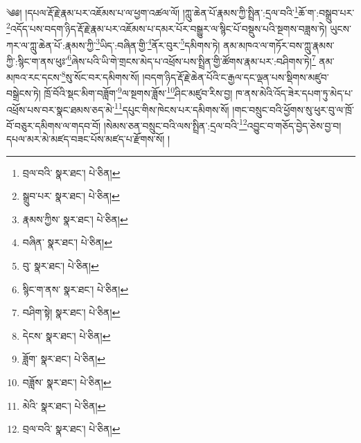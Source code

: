 \setcounter{footnote}{0} 
༄༅། །དཔལ་རྡོ་རྗེ་རྣམ་པར་འཇོམས་པ་ལ་ཕྱག་འཚལ་ལོ། །ཀླུ་ཆེན་པོ་རྣམས་ཀྱི་སྤྲིན་:དྲལ་བའི་\footnote{བྲལ་བའི་  སྣར་ཐང་།  པེ་ཅིན། }ཆོ་ག་:བསྒྲུབ་པར་\footnote{སྒྲུབ་པར་  སྣར་ཐང་།  པེ་ཅིན། }འདོད་པས་བདག་ཉིད་རྡོ་རྗེ་རྣམ་པར་འཇོམས་པ་དམར་པོར་བསྒྱུར་ལ་སྙིང་པོ་བསྡུས་པའི་སྔགས་བཟླས་ཏེ། ཡུངས་ཀར་ལ་ཀླུ་ཆེན་པོ་:རྣམས་ཀྱི་\footnote{རྣམས་ཀྱིས་  སྣར་ཐང་།  པེ་ཅིན། }ཡིད་:བཞིན་གྱི་\footnote{བཞིན་  སྣར་ཐང་།  པེ་ཅིན། }ནོར་བུར་\footnote{བུ་  སྣར་ཐང་།  པེ་ཅིན། }དམིགས་ཏེ། ནམ་མཁའ་ལ་གཏོར་བས་ཀླུ་རྣམས་ཀྱི་:སྙིང་ག་ནས་ཕུཿ་\footnote{སྙིང་ག་ནས་  སྣར་ཐང་།  པེ་ཅིན། }ཞེས་པའི་ཡི་གེ་གྲངས་མེད་པ་འཕྲོས་པས་སྤྲིན་གྱི་ཚོགས་རྣམ་པར་:བཤིགས་ཏེ།\footnote{བཤིག་སྟེ།  སྣར་ཐང་།  པེ་ཅིན། } ནམ་མཁའ་རང་དངས་\footnote{དེངས་  སྣར་ཐང་།  པེ་ཅིན། }སུ་སོང་བར་དམིགས་སོ། །བདག་ཉིད་རྡོ་རྗེ་ཆེན་པོའི་ང་རྒྱལ་དང་ལྡན་པས་སྡིགས་མཛུབ་བསྒྲེངས་ཏེ། ཁྲོ་བོའི་སྡང་མིག་བཟློག་\footnote{ཟློག་  སྣར་ཐང་།  པེ་ཅིན། }ལ་སྔགས་ཟློས་\footnote{བཟློས་  སྣར་ཐང་།  པེ་ཅིན། }ཤིང་མཛུབ་རིས་བྱ། ཁ་ནས་མེའི་འོད་ཟེར་དཔག་ཏུ་མེད་པ་འཕྲོས་པས་བར་སྣང་ཐམས་ཅད་མེ་\footnote{མེའི་  སྣར་ཐང་།  པེ་ཅིན། }དཔུང་གིས་ཁེངས་པར་དམིགས་སོ། །གང་བསྲུང་བའི་ཕྱོགས་སུ་ཕུར་བུ་ལ་ཁྲོ་བོ་བཅུར་དམིགས་ལ་གདབ་བོ། །སེམས་ཅན་བསྲུང་བའི་ལས་སྤྲིན་:དྲལ་བའི་\footnote{བྲལ་བའི་  སྣར་ཐང་།  པེ་ཅིན། }འབྱུང་བ་གཅོད་བྱེད་ཅེས་བྱ་བ། དཔལ་མར་མེ་མཛད་བཟང་པོས་མཛད་པ་རྫོགས་སོ། ། 